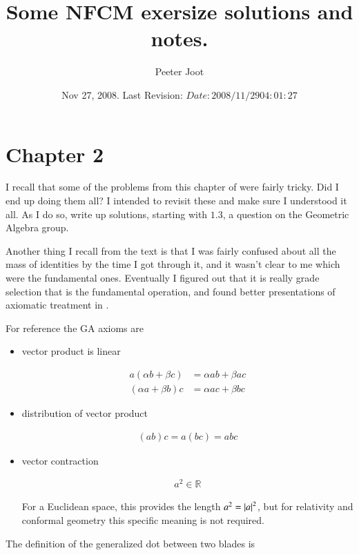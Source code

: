 \documentclass{article}
\title{ Some NFCM exersize solutions and notes. }
\author{Peeter Joot}
\date{ Nov 27, 2008.  Last Revision: $Date: 2008/11/29 04:01:27 $ }
\begin{document}
\maketitle{}

\section{ Chapter 2 }

I recall that some of the problems from this chapter of
\cite{hestenes1999nfc}
were fairly tricky.  Did I end up doing them all?  I intended to
revisit these and make sure I understood it all.  As I do so, write up
solutions, starting with $1.3$, a question on the Geometric Algebra group.

Another thing I recall from the text is that I was fairly confused about
all the mass of identities by the time I got through it, and it wasn't clear
to me which were the fundamental ones.
Eventually I figured out that it is
really grade selection that is the fundamental operation, and
found better presentations of axiomatic treatment in \cite{doran2003gap}.

For reference the GA axioms are

\begin{itemize}
\item vector product is linear

\begin{align}
a ( \alpha b + \beta c) &= \alpha a b + \beta a c \\
( \alpha a + \beta b) c &= \alpha a c + \beta b c
\end{align}

\item distribution of vector product

\begin{align}
(a b) c = a (b c) = a b c
\end{align}

\item vector contraction

\begin{align}\label{eqn:contractionAxiom}
a^2 \in \mathbb{R}
\end{align}

For a Euclidean space, this provides the length $a^2 = \left\lvert{a}\right\rvert^2$, but for relativity and conformal geometry this specific meaning is not required.

\end{itemize}

The definition of the generalized dot between two blades is
\end{document}
